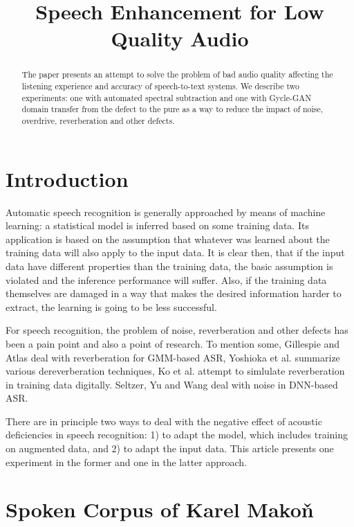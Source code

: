 \documentclass[conference]{IEEEtran}
\title{Speech Enhancement for Low Quality Audio}
\author{
\IEEEauthorblockN{Jan Oldřich Krůza, David Klusáček}
\IEEEauthorblockA{
Institute of Formal and Applied Linguistics,\\
Faculty of Mathematics and Physics,\\
Charles University\\
Email: \{kruza,klusacek\}@ufal.mff.cuni.cz}
}
\begin{document}
\maketitle              %

\begin{abstract}
The paper presents an attempt to solve the problem of bad audio quality
affecting the listening experience and accuracy of speech-to-text systems. We
describe two experiments: one with automated spectral subtraction and one
with Gycle-GAN domain transfer from the defect to the
pure as a way to reduce the impact of noise, overdrive, reverberation and other
defects.
\end{abstract}

\section{Introduction}

Automatic speech recognition is generally approached by means of machine
learning: a statistical model is inferred based on some training data. Its
application is based on the assumption that whatever was learned about the training
data will also apply to the input data. It is clear then, that if the input
data have different properties than the training data, the basic assumption is
violated and the inference performance will suffer.
Also, if the training data themselves are damaged in a way that makes the desired
information harder to extract, the learning is going to be less successful.

For speech recognition, the problem of noise, reverberation and other defects
has been a pain point and also a point of research. To mention some, Gillespie
and Atlas\cite{gillespie2002diversity} deal with reverberation for
GMM-based ASR, Yoshioka et al.\cite{reverbmagazine} summarize various
dereverberation techniques, Ko et al.\cite{reverbaugment} attempt to
simlulate reverberation in training data digitally. Seltzer, Yu and
Wang\cite{dnnnoiserobust} deal with noise in DNN-based ASR.

There are in principle two ways to deal with the negative effect of acoustic
deficiencies in speech recognition: 1) to adapt the model, which includes
training on augmented data, and 2) to adapt the input data. This article
presents one experiment in the former and one in the latter approach.

\section{Spoken Corpus of Karel Makoň}
\end{document}
